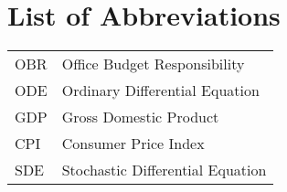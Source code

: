 

\section*{List of Abbreviations}

\begin{doublespacing}
	\begin{center}
			\begin{longtable}{l l}
				OBR		&	Office Budget Responsibility \\
				ODE		&	Ordinary Differential Equation \\
				GDP		&	Gross Domestic Product \\
				CPI		&	Consumer Price Index \\
				SDE		&	Stochastic Differential Equation \\
			\end{longtable}
	\end{center}
\end{doublespacing}

